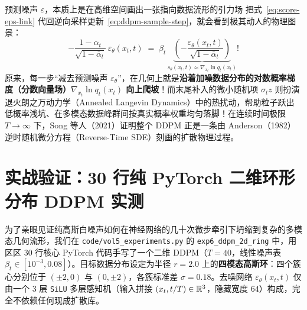 \begin{insightBox}{预测噪声 $\varepsilon$，本质上是在高维空间画出一张指向数据流形的引力场}
把式~\eqref{eq:score-eps-link} 代回逆向采样更新~\eqref{eq:ddpm-sample-step}，就会看到极其动人的物理图景：
\[
  -\frac{1 - \alpha_t}{\sqrt{1 - \bar{\alpha}_t}}\,\varepsilon_\theta(x_t, t)
  \;=\; \beta_t\, \underbrace{\left(-\frac{\varepsilon_\theta(x_t, t)}{\sqrt{1 - \bar{\alpha}_t}}\right)}_{s_\theta(x_t, t) \approx \nabla_{x_t} \ln q_t(x_t)}!
\]
原来，每一步“减去预测噪声 $\varepsilon_\theta$”，在几何上就是\textbf{沿着加噪数据分布的对数概率梯度（分数向量场）$\nabla_{x_t} \ln q_t(x_t)$ 向上爬坡}！而末尾补入的微小随机项 $\sigma_t z$ 则扮演退火朗之万动力学（Annealed Langevin Dynamics）中的热扰动，帮助粒子跃出低概率浅坑、在多模态数据峰群间按真实概率权重均匀落脚！在连续时间极限 $T \to \infty$ 下，Song 等人（2021）证明整个 DDPM 正是一条由 Anderson（1982）逆时随机微分方程（Reverse-Time SDE）刻画的扩散物理过程。
\end{insightBox}

\section{实战验证：30 行纯 PyTorch 二维环形分布 DDPM 实测}
\label{sec:ddpm-exp}

为了亲眼见证纯高斯白噪声如何在神经网络的几十次微步牵引下坍缩到复杂的多模态几何流形，我们在 \texttt{code/vol5\_experiments.py} 的 \texttt{exp6\_ddpm\_2d\_ring} 中，用区区 30 行核心 PyTorch 代码手写了一个二维 DDPM（$T = 40$，线性噪声表 $\beta_t \in [10^{-3}, 0.08]$）。目标数据分布设定为半径 $r = 2.0$ 上的\textbf{四模态高斯环}：四个簇心分别位于 $(\pm 2, 0)$ 与 $(0, \pm 2)$，各簇标准差 $\sigma = 0.18$。去噪网络 $\varepsilon_\theta(x_t, t)$ 仅由一个 3 层 \texttt{SiLU} 多层感知机（输入拼接 $(x_t, t/T) \in \mathbb{R}^3$，隐藏宽度 $64$）构成，完全不依赖任何现成扩散库。

